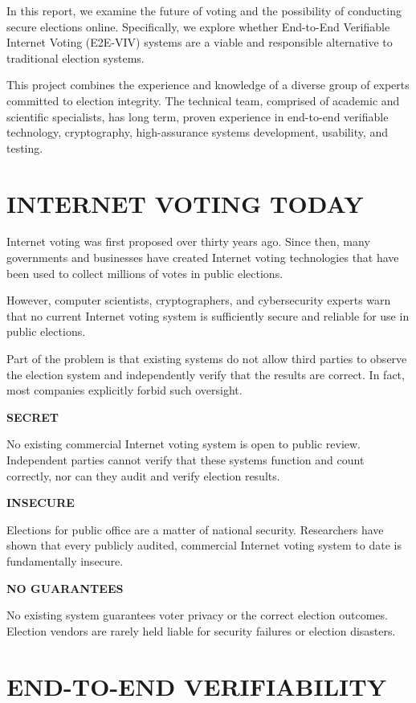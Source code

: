 In this report, we examine the future of voting and the possibility of
conducting secure elections online. Specifically, we explore whether
End-to-End Verifiable Internet Voting (E2E-VIV) systems are a viable
and responsible alternative to traditional election systems.

This project combines the experience and knowledge of a diverse group
of experts committed to election integrity. The technical team,
comprised of academic and scientific specialists, has long term,
proven experience in end-to-end verifiable technology, cryptography,
high-assurance systems development, usability, and testing.

\section*{INTERNET VOTING TODAY}

Internet voting was first proposed over thirty years ago. Since then,
many governments and businesses have created Internet voting
technologies that have been used to collect millions of votes in
public elections.

However, computer scientists, cryptographers, and cybersecurity
experts warn that no current Internet voting system is sufficiently
secure and reliable for use in public elections.

Part of the problem is that existing systems do not allow third
parties to observe the election system and independently verify that
the results are correct.  In fact, most companies explicitly forbid
such oversight.

\noindent \textbf{SECRET}

No existing commercial Internet voting system is open to public
review. Independent parties cannot verify that these systems function
and count correctly, nor can they audit and verify election results.

\textbf{INSECURE}

Elections for public office are a matter of national
security. Researchers have shown that every publicly audited,
commercial Internet voting system to date is fundamentally insecure.

\noindent \textbf{NO GUARANTEES}

No existing system guarantees voter privacy or the correct election
outcomes.  Election vendors are rarely held liable for security
failures or election disasters.

\newpage

\section*{END-TO-END VERIFIABILITY}

